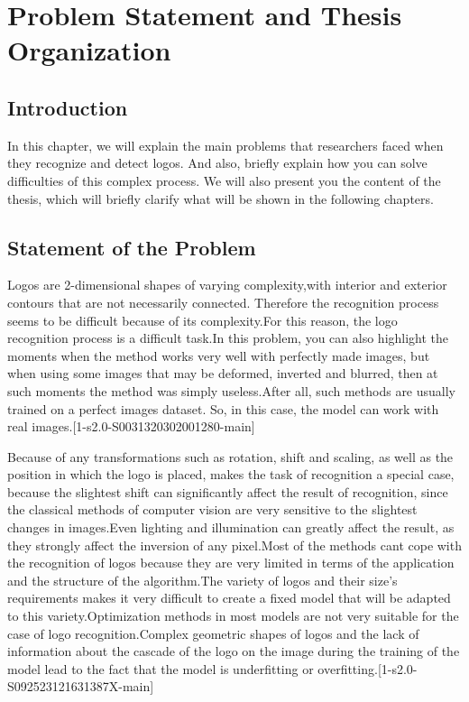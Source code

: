 \chapter{Problem Statement and Thesis Organization}\label{ch:B}
\section{Introduction}\label{sec:2.1}
\par In this chapter, we will explain the main problems that researchers faced when they recognize and detect logos. And also, briefly explain how you can solve difficulties of this complex process. We will also present you the content of the thesis, which will briefly clarify what will be shown in the following chapters.


\vspace{-0.3cm}


\section{Statement of the Problem}\label{sec:2.2}

\par  Logos are 2-dimensional shapes of varying complexity,with interior and exterior contours that are not necessarily connected. Therefore the recognition process seems to be difficult because of its complexity.For this reason, the logo recognition process is a difficult task.In this problem, you can also highlight the moments when the method works very well with perfectly made images, but when using some images that may be deformed, inverted and blurred, then at such moments the method was simply useless.After all, such methods are usually trained on a perfect images dataset. So, in this case, the model can work with real images.[1-s2.0-S0031320302001280-main]

\par Because of any transformations such as rotation, shift and scaling, as well as the position in which the logo is placed, makes the task of recognition a special case, because the slightest shift can significantly affect the result of recognition, since the classical methods of computer vision are very sensitive to the slightest changes in images.Even lighting and illumination can greatly affect the result, as they strongly affect the inversion of any pixel.Most of the methods cant cope with the recognition of logos because they are very limited in terms of the application and the structure of the algorithm.The variety of logos and their size's requirements makes it very difficult to create a fixed model that will be adapted to this variety.Optimization methods in most models are not very suitable for the case of logo recognition.Complex geometric shapes of logos and the lack of information about the cascade of the logo on the image during the training of the model lead to the fact that the model is underfitting or overfitting.[1-s2.0-S092523121631387X-main]


